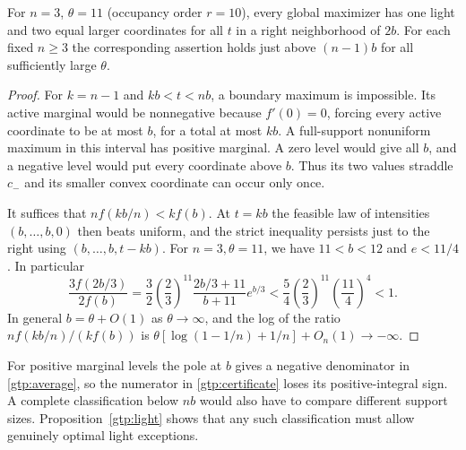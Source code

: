 \begin{proposition}\label{gtp:light}
For $n=3$, $\theta=11$ (occupancy order $r=10$), every global maximizer
has one light and two equal larger coordinates for all $t$ in a right
neighborhood of $2b$. For each fixed $n\ge3$ the corresponding assertion
holds just above $(n-1)b$ for all sufficiently large $\theta$.
\end{proposition}
\begin{proof}
For $k=n-1$ and $kb<t<nb$, a boundary maximum is impossible. Its active
marginal would be nonnegative because $f'(0)=0$, forcing every active
coordinate to be at most $b$, for a total at most $kb$. A full-support
nonuniform maximum in this interval has positive marginal. A zero level
would give all $b$, and a negative level would put every coordinate above
$b$. Thus its two values straddle $c_-$ and its smaller convex coordinate
can occur only once.

It suffices that $n f(kb/n)<k f(b)$. At $t=kb$ the feasible law of
intensities $(b,\ldots,b,0)$ then beats uniform, and the strict inequality
persists just to the right using $(b,\ldots,b,t-kb)$. For $n=3,\theta=11$,
we have $11<b<12$ and $e<11/4$. In particular
\[
 \frac{3f(2b/3)}{2f(b)}
 =\frac32\left(\frac23\right)^{11}
   \frac{2b/3+11}{b+11}e^{b/3}
 <\frac54\left(\frac23\right)^{11}\left(\frac{11}{4}\right)^4<1.
\]
In general $b=\theta+O(1)$ as $\theta\to\infty$, and the log of the ratio
$n f(kb/n)/(k f(b))$ is
$\theta[\log(1-1/n)+1/n]+O_n(1)\to-\infty$.
\end{proof}

For positive marginal levels the pole at $b$ gives a negative denominator
in \eqref{gtp:average}, so the numerator in \eqref{gtp:certificate} loses
its positive-integral sign. A complete classification below $nb$ would
also have to compare different support sizes. Proposition~\ref{gtp:light}
shows that any such classification must allow genuinely optimal light
exceptions.
